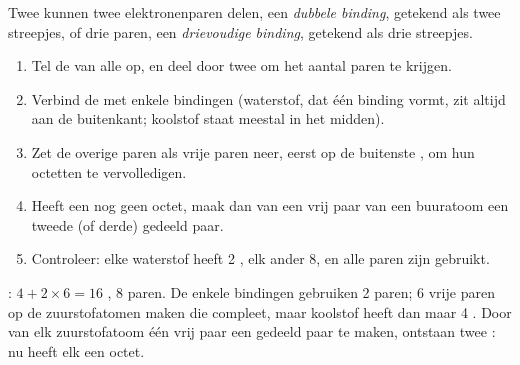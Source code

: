 \begin{definition}\label{def:g10:lewis-and-shape:multiple-bond}
Twee  kunnen twee elektronenparen delen, een \emph{dubbele
binding}, getekend als twee streepjes, of drie
paren, een \emph{drievoudige binding},
getekend als drie streepjes.
\end{definition}

\begin{method}\label{met:g10:lewis-and-shape:draw}
\begin{enumerate}
  \item Tel de  van alle  op, en deel door twee
        om het aantal paren te krijgen.
  \item Verbind de  met enkele bindingen (waterstof, dat één binding
        vormt, zit altijd aan de buitenkant; koolstof staat meestal in het
        midden).
  \item Zet de overige paren als vrije paren neer, eerst op de buitenste
        , om hun octetten te vervolledigen.
  \item Heeft een  nog geen octet, maak dan van een vrij paar van een
        buuratoom een tweede (of derde) gedeeld paar.
  \item Controleer: elke waterstof heeft 2 , elk ander  8,
        en alle paren zijn gebruikt.
\end{enumerate}
\end{method}

\begin{example}[Koolstofdioxide]\label{ex:g10:lewis-and-shape:co2}
: $4 + 2 \times 6 = 16$ , 8 paren. De enkele
bindingen  gebruiken 2 paren; 6 vrije paren op de zuurstofatomen
maken die compleet, maar koolstof heeft dan maar 4 . Door van
elk zuurstofatoom één vrij paar een gedeeld paar te maken, ontstaan twee
: nu heeft elk  een octet.
\end{example}


